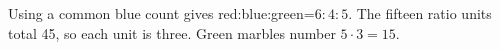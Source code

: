 Using a common blue count gives red:blue:green=$6:4:5$. The fifteen ratio units total 45, so each unit is three. Green marbles number $5\cdot3=\boxed{15}$.
